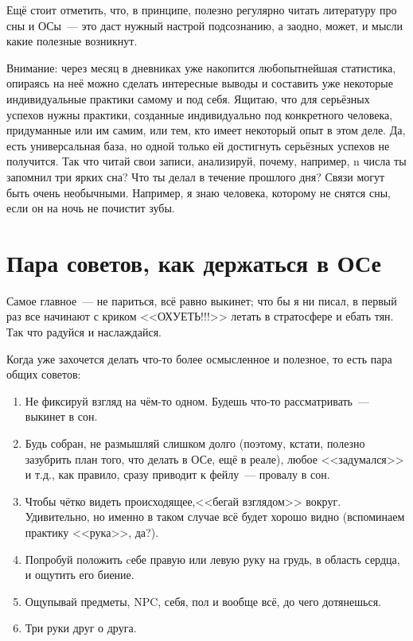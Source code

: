 \documentclass[a5paper,12pt,twoside]{memoir}
\begin{document}
Ещё стоит отметить, что, в принципе, полезно регулярно читать литературу про сны и ОСы~--- это даст нужный настрой подсознанию, а заодно, может, и мысли какие полезные возникнут.

Внимание: через месяц в дневниках уже накопится любопытнейшая статистика, опираясь на неё можно сделать интересные выводы и составить уже некоторые индивидуальные практики самому и под себя. Ящитаю, что для серьёзных успехов нужны практики, созданные индивидуально под конкретного человека, придуманные или им самим, или тем, кто имеет некоторый опыт в этом деле. Да, есть универсальная база, но одной только ей достигнуть серьёзных успехов не получится. Так что читай свои записи, анализируй, почему, например, n числа ты запомнил три ярких сна? Что ты делал в течение прошлого дня? Связи могут быть очень необычными. Например, я знаю человека, которому не снятся сны, если он на ночь не почистит зубы. 

\section{Пара советов, как держаться в ОСе}

Самое главное~--- не париться, всё равно выкинет; что бы я ни писал, в первый раз все начинают с криком <<ОХУЕТЬ!!!>> летать в стратосфере и ебать тян. Так что радуйся и наслаждайся.

Когда уже захочется делать что-то более осмысленное и полезное, то есть пара общих советов:
\begin{enumerate}
\item Не фиксируй взгляд на чём-то одном. Будешь что-то рассматривать~--- выкинет в сон.
\item Будь собран, не размышляй слишком долго (поэтому, кстати, полезно зазубрить план того, что делать в ОСе, ещё в реале), любое <<задумался>> и т.д., как правило, сразу приводит к фейлу~--- провалу в сон.
\item Чтобы чётко видеть происходящее,<<бегай взглядом>> вокруг. Удивительно, но именно в таком случае всё будет хорошо видно (вспоминаем практику <<рука>>, да?).
\item Попробуй положить cебе правую или левую руку на грудь, в область сердца, и ощутить его биение.
\item Ощупывай предметы, NPC, себя, пол и вообще всё, до чего дотянешься.
\item Три руки друг о друга.
\end{enumerate}   
\end{document}
